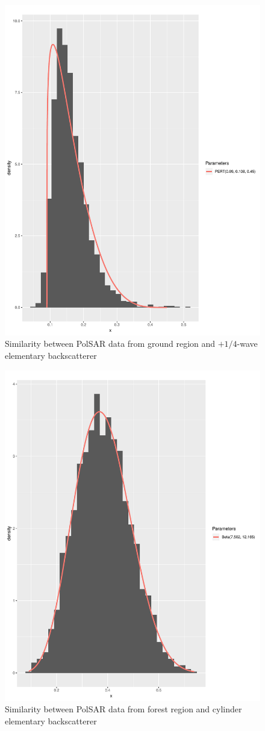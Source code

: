 \documentclass[conference]{IEEEtran}
\begin{document}
\begin{figure}[!ht]
    \centering
    \includegraphics[width = .9\linewidth, height = .7\linewidth]{../../../Figures/paper_19_05/wvp_ground.pdf}
    \caption{Similarity between PolSAR data from ground region and $+1/4$-wave elementary backscatterer}
    \label{fig:gr_wvp}
\end{figure}

\begin{figure}[!ht]
    \centering
    \includegraphics[width = .9\linewidth, height = .7\linewidth]{../../../Figures/paper_19_05/cy_vegetation.pdf}
    \caption{Similarity between PolSAR data from forest region and cylinder elementary backscatterer}
    \label{fig:fr_cy}
\end{figure}
\end{document}
